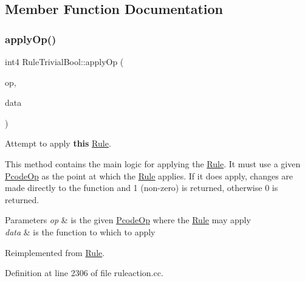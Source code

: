 \subsection{Member Function Documentation}
\mbox{\label{class_rule_trivial_bool_a0254986d799ca6fd09ecb6e96288eae1}} 
\subsubsection{\texorpdfstring{applyOp()}{applyOp()}}
{\footnotesize\ttfamily int4 Rule\+Trivial\+Bool\+::apply\+Op (\begin{DoxyParamCaption}\item[{\mbox{\hyperlink{class_pcode_op}{Pcode\+Op}} $\ast$}]{op,  }\item[{\mbox{\hyperlink{class_funcdata}{Funcdata}} \&}]{data }\end{DoxyParamCaption})\hspace{0.3cm}{\ttfamily [virtual]}}



Attempt to apply {\bfseries{this}} \mbox{\hyperlink{class_rule}{Rule}}. 

This method contains the main logic for applying the \mbox{\hyperlink{class_rule}{Rule}}. It must use a given \mbox{\hyperlink{class_pcode_op}{Pcode\+Op}} as the point at which the \mbox{\hyperlink{class_rule}{Rule}} applies. If it does apply, changes are made directly to the function and 1 (non-\/zero) is returned, otherwise 0 is returned. 
\begin{DoxyParams}{Parameters}
{\em op} & is the given \mbox{\hyperlink{class_pcode_op}{Pcode\+Op}} where the \mbox{\hyperlink{class_rule}{Rule}} may apply \\
\hline
{\em data} & is the function to which to apply \\
\hline
\end{DoxyParams}


Reimplemented from \mbox{\hyperlink{class_rule_a4e3e61f066670175009f60fb9dc60848}{Rule}}.



Definition at line 2306 of file ruleaction.\+cc.

